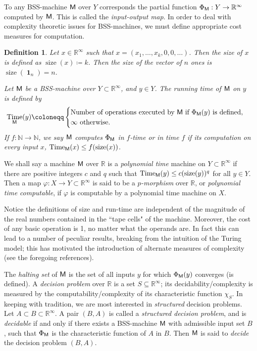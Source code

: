 \documentclass{amsart}
\theoremstyle{theorem}
\newtheorem{definition}[theorem]{Definition}
\theoremstyle{remark}
\DeclareMathOperator{\Size}{size}
\DeclareMathOperator{\Time}{Time}
\DeclareMathOperator{\One}{\textbf{1}}
\newcommand{\NN}{\mathbb{N}}
\newcommand{\RR}{\mathbb{R}}
\newcommand{\ccM}{\textsf{\upshape M}}
\begin{document}
To any BSS-machine $\ccM$ over $Y$ corresponds the partial function $\Phi_\ccM:Y\rightarrow \RR^\infty$ computed by $\ccM$. This is called the \emph{input-output map}.
In order to deal with complexity theoretic issues for BSS-machines, we must define appropriate cost measures for computation.

\begin{definition}
Let $x \in \RR^\infty$ such that $x = (x_1,\dots,x_k,0,0,\dots)$. Then the \emph{size} of $x$ is defined as $\Size(x) \coloneqq k$. Then the size of the vector of $n$ ones is $\Size(\One_n) = n$.

Let $\ccM$ be a BSS-machine over $Y\subset \RR^\infty$, and $y \in Y$. The \emph{running time} of $\ccM$ on $y$ is defined by
\[
\Time_\ccM(y)\coloneqq \begin{cases}
\text{Number of operations executed by $\ccM$ if $\Phi_\ccM(y)$ is defined},\\
\infty \text{ otherwise}.
\end{cases}
\]
If $f:\NN\rightarrow \NN$, we say $\ccM$ computes $\Phi_\ccM$ in \emph{$f$-time} or \emph{in time $f$} if its computation on every input $x$, $\Time_\ccM(x) \leq f(\Size(x))$.
\end{definition}

We shall say  a machine $\ccM$ over $\RR$ is a \emph{polynomial time} machine on $Y \subset \RR^\infty$ if there are positive integers $c$ and $q$ such that $\Time_\ccM(y) \leq c(\Size(y))^q$ for all $y \in Y$. Then a map $\varphi:X\rightarrow Y \subset \RR^\infty$ is said to be a \emph{$p$-morphism} over $\RR$, or \emph{polynomial time computable}, if $\varphi$ is computable by a polynomial time machine on $X$.

Notice the definitions of size and run-time are independent of the magnitude of the real numbers contained in the ``tape cells" of the machine.
Moreover, the cost of any basic operation is 1, no matter what the operands are.
In fact this can lead to a number of peculiar results, breaking from the intuition of the Turing model; this has motivated the introduction of alternate measures of complexity (see the foregoing references).

The \emph{halting set} of $\ccM$ is the set of all inputs $y$ for which $\Phi_\ccM(y)$ converges (is defined).
A \emph{decision problem} over $\RR$ is a set $S \subseteq \RR^\infty$; its decidability/complexity is measured by the computability/complexity of its characteristic function $\chi_S$.
In keeping with tradition, we are most interested in \emph{structured} decision problems.
Let $A \subset B \subset \RR^\infty$.
A pair $(B, A)$ is called a \emph{structured decision problem}, and is \emph{decidable} if and only if there exists a BSS-machine $\ccM$ with admissible input set $B$, such that $\Phi_\ccM$ is the characteristic function of $A$ in $B$. Then $\ccM$ is said to \emph{decide} the decision problem $(B, A)$.
\end{document}
